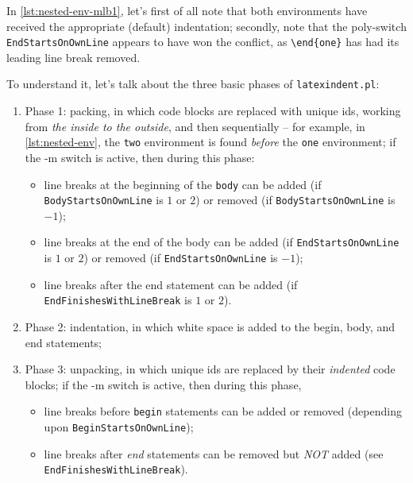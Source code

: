 	In \cref{lst:nested-env-mlb1}, let's first of all note that both environments have received the appropriate (default) indentation; secondly,
	note that the poly-switch \texttt{EndStartsOnOwnLine} appears to have won the conflict, as \lstinline!\end{one}! has had its leading line break removed.

	To understand it, let's talk about the three basic phases of \texttt{latexindent.pl}:
	\begin{enumerate}
		\item Phase 1: packing, in which code blocks are replaced with unique ids, working from \emph{the inside to the outside}, and then sequentially -- for example, in
		      \cref{lst:nested-env}, the \texttt{two} environment is found \emph{before} the \texttt{one} environment; if the -m switch is active, then during this phase:
		      \begin{itemize}
			      \item line breaks at the beginning of the \texttt{body} can be added (if \texttt{BodyStartsOnOwnLine} is $1$ or $2$) or removed (if \texttt{BodyStartsOnOwnLine} is $-1$);
			      \item line breaks at the end of the body can be added (if \texttt{EndStartsOnOwnLine} is $1$ or $2$) or removed (if \texttt{EndStartsOnOwnLine} is $-1$);
			      \item line breaks after the end statement can be added (if \texttt{EndFinishesWithLineBreak} is $1$ or $2$).
		      \end{itemize}
		\item Phase 2: indentation, in which white space is added to the begin, body, and end statements;
		\item Phase 3: unpacking, in which unique ids are replaced by their \emph{indented} code blocks; if the -m switch is active, then during this phase,
		      \begin{itemize}
			      \item line breaks before \texttt{begin} statements can be added or removed (depending upon \texttt{BeginStartsOnOwnLine});
			      \item line breaks after \emph{end} statements can be removed but \emph{NOT} added (see \texttt{EndFinishesWithLineBreak}).
		      \end{itemize}
	\end{enumerate}

